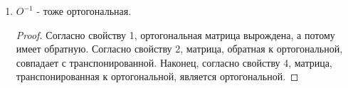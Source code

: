 \begin{enumerate}
\begin{proof}
        $$(OQ)^T(OQ) = (Q^TO^T)OQ = Q^T(O^TO)Q = Q^TEQ = Q^TQ = E.$$
    \end{proof}

    \item $O^{-1}$ - тоже ортогональная.

    \begin{proof}
        Согласно свойству 1, ортогональная матрица вырождена, а потому имеет обратную. Согласно свойству 2, матрица, обратная к ортогональной, совпадает с транспонированной. Наконец, согласно свойству 4, матрица, транспонированная к ортогональной, является ортогональной.
    \end{proof}
\end{enumerate}